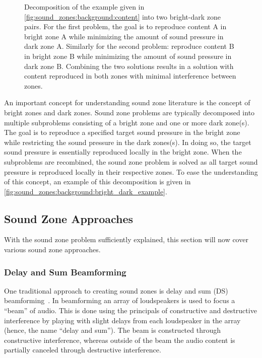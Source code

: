 \begin{figure}[]
    \centering
    \begin{subfigure}{0.49\linewidth}
        \centering
        \scalebox{0.9}{}
    \end{subfigure}
    \begin{subfigure}{0.49\linewidth}
        \centering
        \scalebox{0.9}{}
    \end{subfigure}
    \caption{Decomposition of the example given in \autoref{fig:sound_zones:background:content} into two bright-dark zone pairs.
        For the first problem, the goal is to reproduce content A in bright zone A while minimizing the amount of sound pressure in dark zone A.
        Similarly for the second problem: reproduce content B in bright zone B while minimizing the amount of sound pressure in dark zone B.
        Combining the two solutions results in a solution with content reproduced in both zones with minimal interference between zones.}
    \label{fig:sound_zones:background:bright_dark_example}
\end{figure}

An important concept for understanding sound zone literature is the concept of bright zones and dark zones.
Sound zone problems are typically decomposed into multiple subproblems consisting of a bright zone and one or more dark zone(s).
The goal is to reproduce a specified target sound pressure in the bright zone while restricting the sound pressure in the dark zones(s).
In doing so, the target sound pressure is essentially reproduced locally in the bright zone.
When the subproblems are recombined, the sound zone problem is solved as all target sound pressure is reproduced locally in their respective zones.
To ease the understanding of this concept, an example of this decomposition is given in \autoref{fig:sound_zones:background:bright_dark_example}.

\subsection{Sound Zone Approaches}
\label{ch:sound_zone:approach_review:approaches}
With the sound zone problem sufficiently explained, this section will now cover various sound zone approaches.

\subsubsection{Delay and Sum Beamforming}
One traditional approach to creating sound zones is delay and sum (DS) beamforming~\cite{olik2013comparative}.
In beamforming an array of loudspeakers is used to focus a ``beam'' of audio.
This is done using the principals of constructive and destructive interference by playing with slight delays from each loudspeaker in the array (hence, 
the name ``delay and sum'').
The beam is constructed through constructive interference, whereas outside of the beam the audio content is partially canceled through destructive interference.

